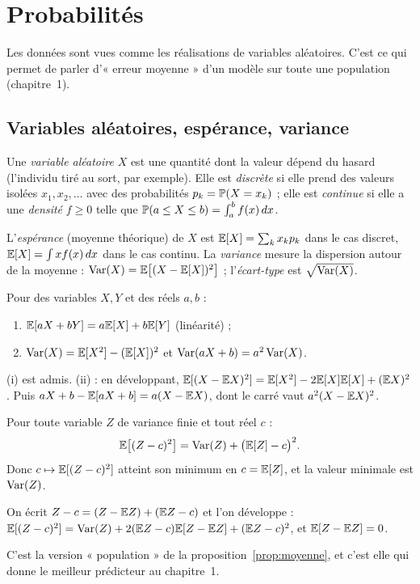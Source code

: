 \section{Probabilités}
\label{sec:probabilites}

Les données sont vues comme les réalisations de variables aléatoires. C'est ce qui permet de parler d'« erreur moyenne » d'un modèle sur toute une population (chapitre~1).

\subsection{Variables aléatoires, espérance, variance}

\begin{definition}
Une \emph{variable aléatoire} $X$ est une quantité dont la valeur dépend du hasard (l'individu tiré au sort, par exemple).
Elle est \emph{discrète} si elle prend des valeurs isolées $x_1,x_2,\dots$ avec des probabilités $p_k=\P(X=x_k)$ ;
elle est \emph{continue} si elle a une \emph{densité} $f\ge0$ telle que $\P(a\le X\le b)=\int_a^bf(x)\,dx$.
\end{definition}

\begin{definition}
L'\emph{espérance} (moyenne théorique) de $X$ est $\E[X]=\sum_kx_kp_k$ dans le cas discret, $\E[X]=\int xf(x)\,dx$ dans le cas continu.
La \emph{variance} mesure la dispersion autour de la moyenne : $\Var(X)=\E\big[(X-\E[X])^2\big]$ ; l'\emph{écart-type} est $\sqrt{\Var(X)}$.
\end{definition}

\begin{proposition}
\label{prop:regles}
Pour des variables $X,Y$ et des réels $a,b$ :
\begin{enumerate}[label=(\roman*)]
  \item $\E[aX+bY]=a\E[X]+b\E[Y]$ (linéarité) ;
  \item $\Var(X)=\E[X^2]-(\E[X])^2$ et $\Var(aX+b)=a^2\Var(X)$.
\end{enumerate}
\end{proposition}
\begin{preuve}
(i) est admis. (ii) : en développant, $\E[(X-\E X)^2]=\E[X^2]-2\E[X]\E[X]+(\E X)^2$. Puis $aX+b-\E[aX+b]=a(X-\E X)$, dont le carré vaut $a^2(X-\E X)^2$.
\end{preuve}

\begin{proposition}
\label{prop:meilleureconstante}
Pour toute variable $Z$ de variance finie et tout réel $c$ :
\[
  \E\big[(Z-c)^2\big]=\Var(Z)+\big(\E[Z]-c\big)^2 .
\]
Donc $c\mapsto\E[(Z-c)^2]$ atteint son minimum en $c=\E[Z]$, et la valeur minimale est $\Var(Z)$.
\end{proposition}
\begin{preuve}
On écrit $Z-c=(Z-\E Z)+(\E Z-c)$ et l'on développe :
$\E[(Z-c)^2]=\Var(Z)+2(\E Z-c)\E[Z-\E Z]+(\E Z-c)^2$, et $\E[Z-\E Z]=0$.
\end{preuve}
C'est la version « population » de la proposition~\ref{prop:moyenne}, et c'est elle qui donne le meilleur prédicteur au chapitre~1.

